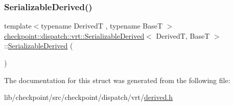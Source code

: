 \mbox{\label{structcheckpoint_1_1dispatch_1_1vrt_1_1_serializable_derived_a126a4835f6c6d1ba25afe7647959e3b6}} 
\subsubsection{\texorpdfstring{Serializable\+Derived()}{SerializableDerived()}\hspace{0.1cm}{\footnotesize\ttfamily [2/2]}}
{\footnotesize\ttfamily template$<$typename DerivedT , typename BaseT $>$ \\
\hyperlink{structcheckpoint_1_1dispatch_1_1vrt_1_1_serializable_derived}{checkpoint\+::dispatch\+::vrt\+::\+Serializable\+Derived}$<$ DerivedT, BaseT $>$\+::\hyperlink{structcheckpoint_1_1dispatch_1_1vrt_1_1_serializable_derived}{Serializable\+Derived} (\begin{DoxyParamCaption}{ }\end{DoxyParamCaption})\hspace{0.3cm}{\ttfamily [default]}}



The documentation for this struct was generated from the following file\+:\begin{DoxyCompactItemize}
\item 
lib/checkpoint/src/checkpoint/dispatch/vrt/\hyperlink{derived_8h}{derived.\+h}\end{DoxyCompactItemize}
